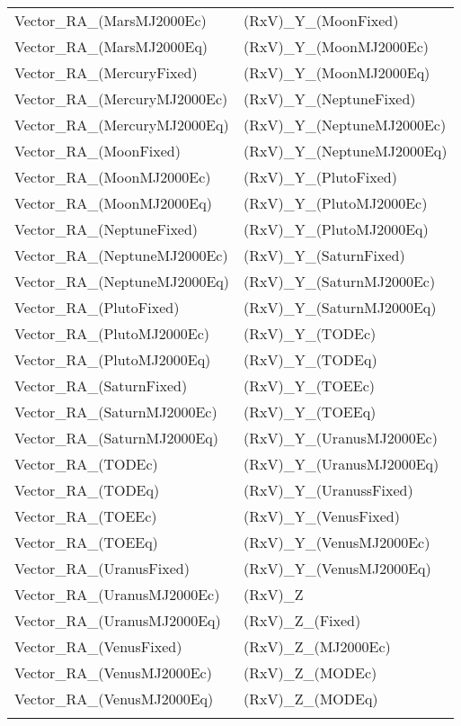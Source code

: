 \begin{table}[htbp!]
\begin{tabular}{ll}
    Vector\_RA\_(MarsMJ2000Ec) & (RxV)\_Y\_(MoonFixed)\\
    Vector\_RA\_(MarsMJ2000Eq) & (RxV)\_Y\_(MoonMJ2000Ec)\\
    Vector\_RA\_(MercuryFixed) & (RxV)\_Y\_(MoonMJ2000Eq)\\
    Vector\_RA\_(MercuryMJ2000Ec) & (RxV)\_Y\_(NeptuneFixed)\\
    Vector\_RA\_(MercuryMJ2000Eq) & (RxV)\_Y\_(NeptuneMJ2000Ec)\\
    Vector\_RA\_(MoonFixed) & (RxV)\_Y\_(NeptuneMJ2000Eq)\\
    Vector\_RA\_(MoonMJ2000Ec) & (RxV)\_Y\_(PlutoFixed)\\
    Vector\_RA\_(MoonMJ2000Eq) & (RxV)\_Y\_(PlutoMJ2000Ec)\\
    Vector\_RA\_(NeptuneFixed) & (RxV)\_Y\_(PlutoMJ2000Eq)\\
    Vector\_RA\_(NeptuneMJ2000Ec) & (RxV)\_Y\_(SaturnFixed)\\
    Vector\_RA\_(NeptuneMJ2000Eq) & (RxV)\_Y\_(SaturnMJ2000Ec)\\
    Vector\_RA\_(PlutoFixed) & (RxV)\_Y\_(SaturnMJ2000Eq)\\
    Vector\_RA\_(PlutoMJ2000Ec) & (RxV)\_Y\_(TODEc)\\
    Vector\_RA\_(PlutoMJ2000Eq) & (RxV)\_Y\_(TODEq)\\
    Vector\_RA\_(SaturnFixed) & (RxV)\_Y\_(TOEEc)\\
    Vector\_RA\_(SaturnMJ2000Ec) & (RxV)\_Y\_(TOEEq)\\
    Vector\_RA\_(SaturnMJ2000Eq) & (RxV)\_Y\_(UranusMJ2000Ec)\\
    Vector\_RA\_(TODEc) & (RxV)\_Y\_(UranusMJ2000Eq)\\
    Vector\_RA\_(TODEq) & (RxV)\_Y\_(UranussFixed)\\
    Vector\_RA\_(TOEEc) & (RxV)\_Y\_(VenusFixed)\\
    Vector\_RA\_(TOEEq) & (RxV)\_Y\_(VenusMJ2000Ec)\\
    Vector\_RA\_(UranusFixed) & (RxV)\_Y\_(VenusMJ2000Eq)\\
    Vector\_RA\_(UranusMJ2000Ec) & (RxV)\_Z\\
    Vector\_RA\_(UranusMJ2000Eq) & (RxV)\_Z\_(Fixed)\\
    Vector\_RA\_(VenusFixed) & (RxV)\_Z\_(MJ2000Ec)\\
    Vector\_RA\_(VenusMJ2000Ec) & (RxV)\_Z\_(MODEc)\\
    Vector\_RA\_(VenusMJ2000Eq) & (RxV)\_Z\_(MODEq)\\
\label{Table: AstroCalcVectorElems2}
\end{tabular}
\end{table}

